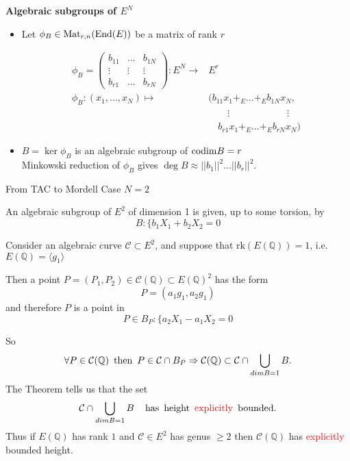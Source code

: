 \documentclass[handout]{beamer}
\newcommand{\codim}{{\rm{codim}}}
\newcommand{\qe}{\mathbb{Q}}
\newcommand{\Ci}{\mathcal{C}}
\begin{document}
\begin{frame} {\bf Algebraic subgroups of $E^N$}
\small\begin{itemize}
\item   Let $\phi_B\in{ \rm{Mat}}_{r,n}({\rm End}(E))$ be a matrix of rank $r$\pause
  {\begin{tcolorbox}					\begin{equation*}
\begin{split}
\phi_B= 
 \left(\begin{array}{cccccc}
b_{11}&\dots &b_{1N}\\
 \vdots & \vdots&  \vdots\\
b_{r1}&\dots &b_{rN}
\end{array}\right): E^N\to & E^r\\
\phi_B:(x_1,\dots,x_N) \mapsto &({b_{11}}x_1+_E ...+_E{b_{1N}}x_N, 
\\ \phantom{bsbkbjkdff}&\quad\quad\vdots \quad  \phantom{bfdghdgf}  \quad \vdots
\\ \phantom{bnnf}&\quad {b_{r1}}x_1+_E...+_E {b_{rN}}x_N)
\end{split}
\end{equation*}


				\end{tcolorbox}}\pause
\item $B= \ker \phi_B $ is an algebraic subgroup of $\codim B= r$\pause \\
Minkowski reduction of $\phi_B$ gives $\deg B \approx ||b_1||^2\dots ||b_r||^2$.


\end{itemize}
\end{frame}







\begin{frame}{From TAC to Mordell}
{Case $N=2$}

An algebraic subgroup of $E^2$ of dimension 1 is given, up to some torsion, by
$$B:\{ b_1X_1+b_2X_2=0$$

Consider an algebraic curve $\Ci\subset E^2$, and suppose that $\mathrm{rk}(E(\qe))= 1$, i.e. $E(\qe)=\langle g_1\rangle$

Then a point $P=(P_1,P_2)\in \Ci(\qe)\subset E(\qe)^2$ has the form $$P=(a_1 g_1,a_2 g_1)$$ and therefore $P$ is a point in 
$$P \in B_P:\{ a_2X_1-a_1X_2=0$$

So $$\forall P \in \Ci(\qe) \,\,\, {\rm then} \,\,\,  P \in \Ci \cap B_P \Rightarrow \Ci(\qe)\subset \Ci \cap \bigcup_{dim B=1} B.$$ 
 The Theorem tells us that   the set $$\Ci \cap \bigcup_{dim B=1} B \quad {\rm \, has \,\,\, height \,\,\,  {\textcolor{red}{explicitly} }\,\,\, bounded.}$$  Thus   if $E(\qe)$ has rank $1$ and $\Ci \in E^2$ has genus $\ge 2$ then $\Ci(\qe)$ has {\textcolor{red}{explicitly}}  bounded height.
 \end{frame}
\end{document}
